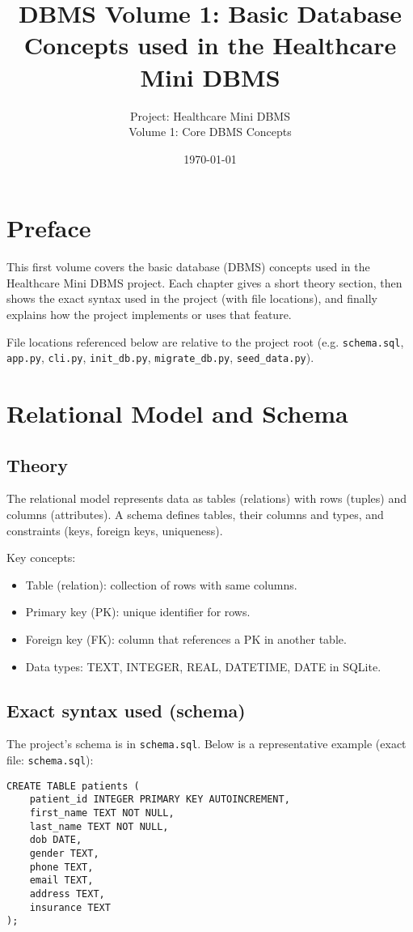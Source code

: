 \documentclass[11pt,a4paper]{article}
\title{DBMS Volume 1: Basic Database Concepts used in the Healthcare Mini DBMS}
\author{Project: Healthcare Mini DBMS\\Volume 1: Core DBMS Concepts}
\date{\today}
\begin{document}
\maketitle
\tableofcontents
\thispagestyle{empty}
\newpage

\section*{Preface}
This first volume covers the basic database (DBMS) concepts used in the Healthcare Mini DBMS project. Each chapter gives a short theory section, then shows the exact syntax used in the project (with file locations), and finally explains how the project implements or uses that feature.

File locations referenced below are relative to the project root (e.g. \texttt{schema.sql}, \texttt{app.py}, \texttt{cli.py}, \texttt{init_db.py}, \texttt{migrate_db.py}, \texttt{seed_data.py}).

\section{Relational Model and Schema}
\subsection{Theory}
The relational model represents data as tables (relations) with rows (tuples) and columns (attributes). A schema defines tables, their columns and types, and constraints (keys, foreign keys, uniqueness).

Key concepts:
\begin{itemize}
  \item Table (relation): collection of rows with same columns.
  \item Primary key (PK): unique identifier for rows.
  \item Foreign key (FK): column that references a PK in another table.
  \item Data types: TEXT, INTEGER, REAL, DATETIME, DATE in SQLite.
\end{itemize}

\subsection{Exact syntax used (schema)}
The project's schema is in \texttt{schema.sql}. Below is a representative example (exact file: \texttt{schema.sql}):
\begin{lstlisting}
CREATE TABLE patients (
    patient_id INTEGER PRIMARY KEY AUTOINCREMENT,
    first_name TEXT NOT NULL,
    last_name TEXT NOT NULL,
    dob DATE,
    gender TEXT,
    phone TEXT,
    email TEXT,
    address TEXT,
    insurance TEXT
);
\end{lstlisting}
\end{document}
